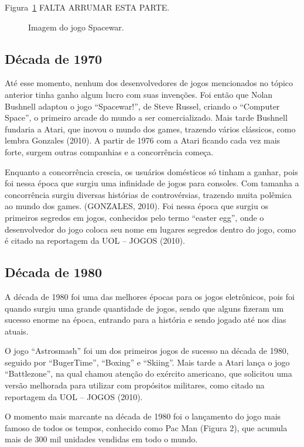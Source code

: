 Figura~\ref{f1.1} FALTA ARRUMAR ESTA PARTE.
\begin{figure}[!hbp]
\makebox[\textwidth]{\framebox[5cm]{\rule{0pt}{5cm}}}
\caption{Imagem do jogo Spacewar.} \label{f1.1}
\end{figure}

\subsection{Década de 1970}

Até esse momento, nenhum dos desenvolvedores de jogos mencionados no tópico anterior tinha ganho algum lucro com suas invenções. Foi então que Nolan Bushnell adaptou o jogo “Spacewar!”, de Steve Russel, criando o “Computer Space”, o primeiro arcade do mundo a ser comercializado. Mais tarde Bushnell fundaria a Atari, que inovou o mundo dos games, trazendo vários clássicos, como lembra Gonzales (2010). A partir de 1976 com a Atari ficando cada vez mais forte, surgem outras companhias e a concorrência começa.

Enquanto a concorrência crescia, os usuários domésticos só tinham a ganhar, pois foi nessa época que surgiu uma infinidade de jogos para consoles. Com tamanha a concorrência surgiu diversas histórias de controvérsias, trazendo muita polêmica ao mundo dos games. (GONZALES, 2010). Foi nessa época que surgiu os primeiros segredos em jogos, conhecidos pelo termo “easter egg”, onde o desenvolvedor do jogo coloca seu nome em lugares segredos dentro do jogo, como é citado na reportagem da UOL – JOGOS (2010).

\subsection{Década de 1980}

A década de 1980 foi uma das melhores épocas para os jogos eletrônicos, pois foi quando surgiu uma grande quantidade de jogos, sendo que alguns fizeram um sucesso enorme na época, entrando para a história e sendo jogado até nos dias atuais.

O jogo “Astrosmash” foi um dos primeiros jogos de sucesso na década de 1980, seguido por “BugerTime”, “Boxing” e “Skiing”. Mais tarde a Atari lança o jogo “Battlezone”, na qual chamou atenção do exército americano, que solicitou uma versão melhorada para utilizar com propósitos militares, como citado na reportagem da UOL – JOGOS (2010).

O momento mais marcante na década de 1980 foi o lançamento do jogo mais famoso de todos os tempos, conhecido como Pac Man (Figura 2), que acumula mais de 300 mil unidades vendidas em todo o mundo.  

